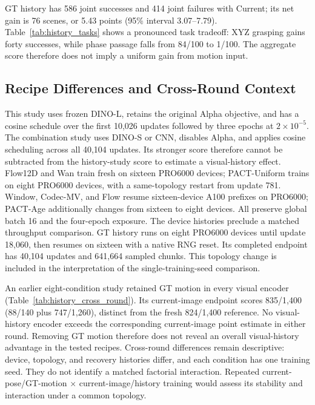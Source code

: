 
GT history has 586 joint successes and 414 joint failures with Current;
its net gain is 76 scenes, or 5.43 points (95\% interval 3.07--7.79).
Table~\ref{tab:history_tasks} shows a pronounced task tradeoff: XYZ grasping
gains forty successes, while phase passage falls from 84/100 to 1/100.
The aggregate score therefore does not imply a uniform gain from motion input.

\subsection{Recipe Differences and Cross-Round Context}
This study uses frozen DINO-L, retains the original Alpha objective,
and has a cosine schedule over the first 10,026 updates followed by three
epochs at $2\times10^{-5}$. The combination study uses DINO-S or CNN,
disables Alpha, and applies cosine scheduling across all 40,104 updates.
Its stronger score therefore cannot be subtracted from the history-study
score to estimate a visual-history effect. Flow12D and Wan train fresh on
sixteen PRO6000 devices; PACT-Uniform trains on eight PRO6000 devices, with
a same-topology restart from update 781. Window, Codec-MV, and Flow resume sixteen-device A100 prefixes
on PRO6000; PACT-Age additionally changes from sixteen to eight devices.
All preserve global batch 16 and the four-epoch exposure. The device histories
preclude a matched throughput comparison.
GT history runs on eight PRO6000 devices until update 18,060, then resumes
on sixteen with a native RNG reset. Its completed endpoint has 40,104 updates
and 641,664 sampled chunks. This topology change is included in the interpretation
of the single-training-seed comparison.


An earlier eight-condition study retained GT motion in every visual encoder
(Table~\ref{tab:history_cross_round}). Its current-image endpoint scores
835/1,400 (88/140 plus 747/1,260), distinct from the fresh 824/1,400 reference.
No visual-history encoder exceeds the corresponding current-image point
estimate in either round. Removing GT motion therefore does not reveal an
overall visual-history advantage in the tested recipes. Cross-round differences
remain descriptive: device, topology, and recovery histories differ, and each
condition has one training seed. They do not identify a matched factorial
interaction. Repeated current-pose/GT-motion $\times$ current-image/history
training would assess its stability and interaction under a common topology.

